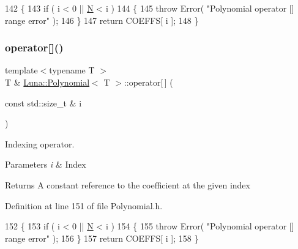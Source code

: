 \begin{DoxyCode}
142   \{
143     \textcolor{keywordflow}{if} ( i < 0 || \hyperlink{namespaceHeat__plot_a7d050092798e28458a263710837bda77}{N} < i )
144     \{
145       \textcolor{keywordflow}{throw} Error( \textcolor{stringliteral}{"Polynomial operator [] range error"} );
146     \}
147     \textcolor{keywordflow}{return} COEFFS[ i ];
148   \}
\end{DoxyCode}
\mbox{\label{classLuna_1_1Polynomial_ae63c47e4aa8a74982a40cd05e032319d}} 
\subsubsection{\texorpdfstring{operator[]()}{operator[]()}\hspace{0.1cm}{\footnotesize\ttfamily [2/2]}}
{\footnotesize\ttfamily template$<$typename T $>$ \\
T \& \hyperlink{classLuna_1_1Polynomial}{Luna\+::\+Polynomial}$<$ T $>$\+::operator\mbox{[}$\,$\mbox{]} (\begin{DoxyParamCaption}\item[{const std\+::size\+\_\+t \&}]{i }\end{DoxyParamCaption})\hspace{0.3cm}{\ttfamily [inline]}}



Indexing operator. 


\begin{DoxyParams}{Parameters}
{\em i} & Index \\
\hline
\end{DoxyParams}
\begin{DoxyReturn}{Returns}
A constant reference to the coefficient at the given index 
\end{DoxyReturn}


Definition at line 151 of file Polynomial.\+h.


\begin{DoxyCode}
152   \{
153     \textcolor{keywordflow}{if} ( i < 0 || \hyperlink{namespaceHeat__plot_a7d050092798e28458a263710837bda77}{N} < i )
154     \{
155       \textcolor{keywordflow}{throw} Error( \textcolor{stringliteral}{"Polynomial operator [] range error"} );
156     \}
157     \textcolor{keywordflow}{return} COEFFS[ i ];
158   \}
\end{DoxyCode}
\mbox{\label{classLuna_1_1Polynomial_a920305bb60451d65e1f4b9f80fa9f436}} 
